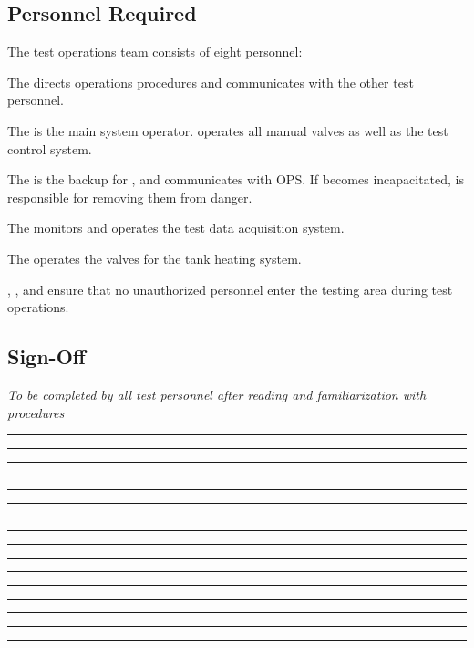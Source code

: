 \subsection{Personnel Required}
The test operations team consists of eight personnel:
\begin{checklist}
    \item The \opsfull{} directs operations procedures and communicates with the other test personnel.
    \item The \primaryfull{} is the main system operator. \primary{} operates all manual valves as well as the test control system.
    \item The \secondaryfull{} is the backup for \primary{}, and communicates with OPS. If \primary{} becomes incapacitated, \secondary{} is responsible for removing them from danger.
    \item The \daqfull{} monitors and operates the test data acquisition system.
    \item The \heatfull{} operates the valves for the tank heating system.
    \item \perifull{}, \periifull{}, and \periiifull{} ensure that no unauthorized personnel enter the testing area during test operations.
\end{checklist}
\setcounter{checklistnum}{0}

\subsection{Sign-Off}
\textit{To be completed by all test personnel after reading and familiarization with procedures}
\begin{checklist}
    \item \opsfull      \tabto{25em}\rule{10em}{0.4pt}\hspace{5em}\rule{10em}{0.4pt}
    \item \primaryfull  \tabto{25em}\rule{10em}{0.4pt}\hspace{5em}\rule{10em}{0.4pt}
    \item \secondaryfull\tabto{25em}\rule{10em}{0.4pt}\hspace{5em}\rule{10em}{0.4pt}
    \item \daqfull      \tabto{25em}\rule{10em}{0.4pt}\hspace{5em}\rule{10em}{0.4pt}
    \item \heatfull     \tabto{25em}\rule{10em}{0.4pt}\hspace{5em}\rule{10em}{0.4pt}
    \item \perifull     \tabto{25em}\rule{10em}{0.4pt}\hspace{5em}\rule{10em}{0.4pt}
    \item \periifull    \tabto{25em}\rule{10em}{0.4pt}\hspace{5em}\rule{10em}{0.4pt}
    \item \periiifull    \tabto{25em}\rule{10em}{0.4pt}\hspace{5em}\rule{10em}{0.4pt}
\end{checklist}
\setcounter{checklistnum}{0}

